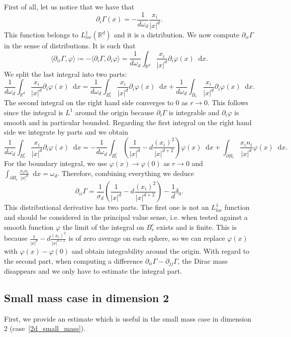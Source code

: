 \documentclass[11pt,a4paper]{article}
\numberwithin{equation}{section}
\newcommand{\R}{{\mathbb{R}}}
\theoremstyle{plain}
\theoremstyle{remark}
\newcommand {\f}{\frac}
\newcommand{\diff}{\mathop{}\!\mathrm{d}}
\begin{document}
First of all, let us notice that we have that
\[
\partial_i \Gamma(x)
 = 
-\f{1}{d\omega_d}
\f{x_i}{|x|^d}.\]
This function belongs to $L^1_{loc}(\R^d)$ and it is a distribution. We now compute $\partial_{ii}\Gamma$ in the sense of distributions. It is such that
$$
    \langle \partial_{ii}\Gamma, \varphi \rangle \coloneqq -\langle \partial_{i}\Gamma,\partial_i\varphi \rangle = \f{1}{d\omega_d}\int_{\R^d}
    \f{x_i}{|x|^d}\partial_i\varphi(x)\diff x.
$$
We split the last integral into two parts:
$$
    \f{1}{d\omega_d}\int_{\R^d}
    \f{x_i}{|x|^d}\partial_i\varphi(x)\diff x=\f{1}{d\omega_d}\int_{B_r^c}
    \f{x_i}{|x|^d}\partial_i\varphi(x)\diff x+\f{1}{d\omega_d}\int_{B_r}
    \f{x_i}{|x|^d}\partial_i\varphi(x)\diff x.
$$
The second integral on the right hand side converges to  $0$ as $r\to 0$.
This follows since the integral is $L^1$ around the origin because $\partial_i\Gamma$ is integrable and $\partial_i \varphi$ is smooth and in particular bounded. 
Regarding the first integral on the right hand side we integrate by parts and we obtain  
$$
    \f{1}{d\omega_d} \int_{B_r^c} 
    \f{x_i}{|x|^d}\partial_i \varphi(x) \diff x = -\f{1}{d\omega_d} \int_{B_r^c} \left(\f{1}{|x|^d} - d\f{(x_i)^2 }{|x|^{d+2}}\right) \varphi(x) \diff x + \int_{\partial B_r}\f{x_in_i}{|x|^d} \varphi(x) \diff x.
$$
For the boundary integral, we use $\varphi(x)\to \varphi(0)$ as $r\to 0$ and $\int_{\partial B_r}\f{x_in_i}{|x|^d}\diff x=\omega_d$. Therefore, combining everything  we deduce 
$$
    \partial_{ii}\Gamma = \frac{1}{\sigma_d} \left(\f{1}{|x|^d}- d\f{(x_i)^2 }{|x|^{d+2}}\right) - \frac1d \delta_0.
$$
This distributional derivative has two parts. The first one is not an $L^1_{loc}$ function and should be considered in the principal value sense, i.e. when tested against a smooth function $\varphi$ the limit of the integral on $B_r^c$ exists and is finite. This is because $\f{1}{|x|^d}-
d\f{(x_i)^2 }{|x|^{d+2}}$ is of zero average on each sphere, so  we can replace $\varphi(x)$ with $
\varphi(x)-\varphi(0)$ and obtain integrability around the origin.
With regard to the second part, when computing a difference 
$\partial_{ii}\Gamma-\partial_{jj}\Gamma$, the Dirac mass disappears and we only have to estimate the integral part.

\subsection{Small mass case in dimension 2}\label{subsec:small_mass_case_dimension_2}
First, we provide an estimate which is useful in the small mass case in dimension 2 (case~\ref{2d_small_mass}). %
\end{document}
